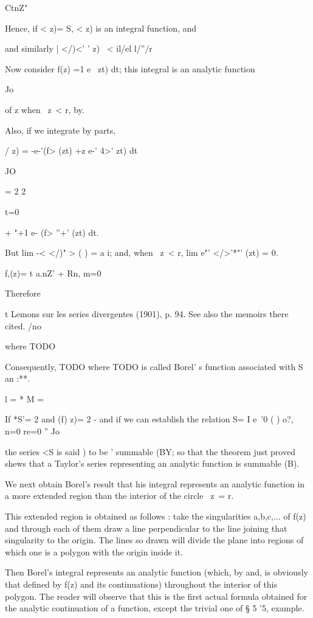 CtnZ"

Hence, if < z)= S, < z) is an integral function, and

and similarly | </)<' ' z) \ < il/el l/''/r

Now consider f(z) =1 e~ zt) dt; this integral is an analytic function

Jo

of z when \ z\ < r, by.

Also, if we integrate by parts,

/ z) = -e-'(f> (zt) +z e-' 4>' zt) dt

JO

= 2 2

 t=0

+ "+1 e- (f> ''+' (zt) dt.

But lim -< </)" > ( ) = a i; and, when \ z\ < r, lim e"' </>'*"' (zt)
= 0.

f,(z)= t a.nZ' + Rn, m=0

Therefore

t Lemons sur les series divergentes (1901), p. 94. See also the
memoirs there cited.
%
%
/no

where TODO

Consequently, TODO
where TODO is called Borel' s function associated with S
an :**.

 l = *  M =

If *S'= 2 and (f) z)= 2 - and if we can establish the relation S= I
e~'0 ( ) o?, n=0 re=0 ''  Jo

the series <S is said ) to be ' summable (BY; so that the
theorem just proved shews that a Taylor's series representing an
analytic function is summable (B).


We next obtain Borel's result that his integral represents an analytic
function in a more extended region than the interior of the circle \
z\ = r.

This extended region is obtained as follows : take the singularities
a,b,c,... of f(z) and through each of them draw a line perpendicular
to the line joining that singularity to the origin. The lines so drawn
will divide the plane into regions of which one is a polygon with the
origin inside it.

Then Borel's integral represents an analytic function (which, by
and\hardsectionref{7}{8}, is obviously that defined by f(z) and its continuations)
throughout the interior of this polygon. The reader will observe that
this is the first actual formula obtained for the analytic
continuation of a function, except the trivial one of § 5 '5, example.


